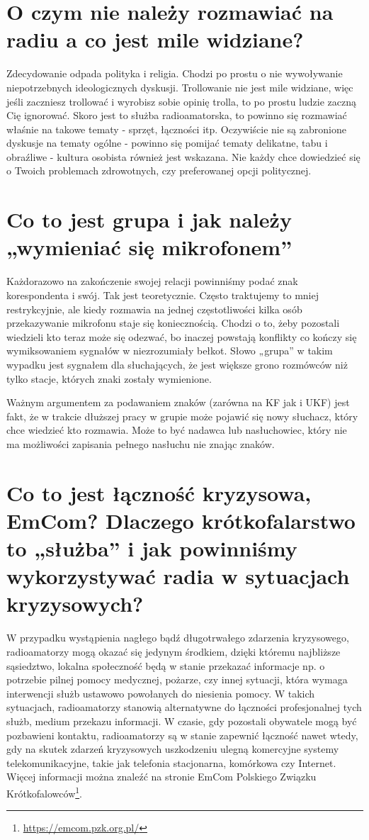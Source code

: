 \documentclass[a4paper,12pt]{article}
\begin{document}
\section{O czym nie należy rozmawiać na radiu a co jest mile widziane?}
Zdecydowanie odpada polityka i religia. Chodzi po prostu o nie wywoływanie niepotrzebnych ideologicznych dyskusji. Trollowanie nie jest mile widziane, więc jeśli zaczniesz trollować i wyrobisz sobie opinię trolla, to po prostu ludzie zaczną Cię ignorować.
Skoro jest to służba radioamatorska, to powinno się rozmawiać właśnie na takowe tematy - sprzęt, łączności itp. Oczywiście nie są zabronione dyskusje na tematy ogólne - powinno się pomijać tematy delikatne, tabu i obraźliwe - kultura osobista również jest wskazana. Nie każdy chce dowiedzieć się o Twoich problemach zdrowotnych, czy preferowanej opcji politycznej.

\section{Co to jest grupa i jak należy „wymieniać się mikrofonem”}
Każdorazowo na zakończenie swojej relacji powinniśmy podać znak korespondenta i swój. Tak jest teoretycznie. Często traktujemy to mniej restrykcyjnie, ale kiedy rozmawia na jednej częstotliwości kilka osób przekazywanie mikrofonu staje się koniecznością. Chodzi o to, żeby pozostali wiedzieli kto teraz może się odezwać, bo inaczej powstają konflikty co kończy się wymiksowaniem sygnałów w niezrozumiały bełkot. Słowo „grupa” w takim wypadku jest sygnałem dla słuchających, że jest większe grono rozmówców niż tylko stacje, których znaki zostały wymienione.

Ważnym argumentem za podawaniem znaków (zarówna na KF jak i UKF) jest fakt, że w trakcie dłuższej pracy w grupie może pojawić się nowy słuchacz, który chce wiedzieć kto rozmawia. Może to być nadawca lub nasłuchowiec, który nie ma możliwości zapisania pełnego nasłuchu nie znając znaków.

\section{Co to jest łączność kryzysowa, EmCom? Dlaczego krótkofalarstwo to „służba” i jak powinniśmy wykorzystywać radia w sytuacjach kryzysowych?}
W przypadku wystąpienia nagłego bądź długotrwałego zdarzenia kryzysowego, radioamatorzy mogą okazać się jedynym środkiem, dzięki któremu najbliższe sąsiedztwo, lokalna społeczność będą w stanie przekazać informacje np. o potrzebie pilnej pomocy medycznej, pożarze, czy innej sytuacji, która wymaga interwencji służb ustawowo powołanych do niesienia pomocy. W takich sytuacjach, radioamatorzy stanowią alternatywne do łączności profesjonalnej tych służb, medium przekazu informacji. W czasie, gdy pozostali obywatele mogą być pozbawieni kontaktu, radioamatorzy są w stanie zapewnić łączność nawet wtedy, gdy na skutek zdarzeń kryzysowych uszkodzeniu ulegną komercyjne systemy telekomunikacyjne, takie jak telefonia stacjonarna, komórkowa czy Internet. Więcej informacji można znaleźć na stronie EmCom Polskiego Związku Krótkofalowców\footnote{\url{https://emcom.pzk.org.pl/}}.
\end{document}
